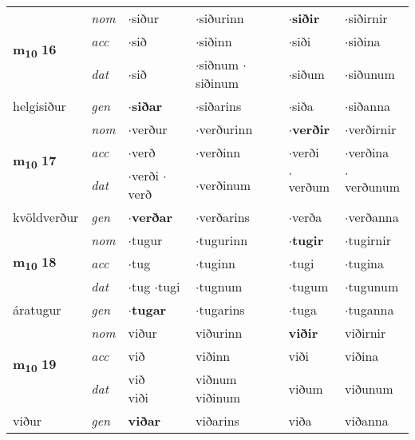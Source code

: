 \begin{longtable}[l]{llllll}
\multirow{3}{*}{{{\textbf{m{\textsubscript{10}}} \Large{\textbf{16}}}}}  & {\footnotesize{{\textit{nom}}}} & $\cdot$siður & $\cdot$siðurinn    & \textbf{$\cdot$siðir} & $\cdot$siðirnir  \\*
 &  {\footnotesize{{\textit{acc}}}} & $\cdot$sið  & $\cdot$siðinn   & $\cdot$siði  & $\cdot$siðina \\*
 &  {\footnotesize{{\textit{dat}}}} & $\cdot$sið & \specialcell{$\cdot$siðnum\\  $\cdot$siðinum}   & $\cdot$siðum & $\cdot$siðunum \\*
 {\footnotesize{helgisiður}} &   {\footnotesize{{\textit{gen}}}} & \textbf{$\cdot$siðar}  & $\cdot$siðarins  & $\cdot$siða & $\cdot$siðanna \\
\cmidrule{1-6}


\multirow{3}{*}{{{\textbf{m{\textsubscript{10}}} \Large{\textbf{17}}}}}  & {\footnotesize{{\textit{nom}}}} & $\cdot$verður & $\cdot$verðurinn    & \textbf{$\cdot$verðir} & $\cdot$verðirnir  \\*
 &  {\footnotesize{{\textit{acc}}}} & $\cdot$verð  & $\cdot$verðinn   & $\cdot$verði  & $\cdot$verðina \\*
 &  {\footnotesize{{\textit{dat}}}} & \specialcell{$\cdot$verði\\  $\cdot$verð} & $\cdot$verðinum   & $\cdot$verðum & $\cdot$verðunum \\*
 {\footnotesize{kvöldverður}} &   {\footnotesize{{\textit{gen}}}} & \textbf{$\cdot$verðar}  & $\cdot$verðarins  & $\cdot$verða & $\cdot$verðanna \\
\cmidrule{1-6}


\multirow{3}{*}{{{\textbf{m{\textsubscript{10}}} \Large{\textbf{18}}}}}  & {\footnotesize{{\textit{nom}}}} & $\cdot$tugur & $\cdot$tugurinn    & \textbf{$\cdot$tugir} & $\cdot$tugirnir  \\*
 &  {\footnotesize{{\textit{acc}}}} & $\cdot$tug  & $\cdot$tuginn   & $\cdot$tugi  & $\cdot$tugina \\*
 &  {\footnotesize{{\textit{dat}}}} & \specialcell{$\cdot$tug\\  $\cdot$tugi} & $\cdot$tugnum   & $\cdot$tugum & $\cdot$tugunum \\*
 {\footnotesize{áratugur}} &   {\footnotesize{{\textit{gen}}}} & \textbf{$\cdot$tugar}  & $\cdot$tugarins  & $\cdot$tuga & $\cdot$tuganna \\
\cmidrule{1-6}


\multirow{3}{*}{{{\textbf{m{\textsubscript{10}}} \Large{\textbf{19}}}}}  & {\footnotesize{{\textit{nom}}}} & viður & viðurinn    & \textbf{viðir} & viðirnir  \\*
 &  {\footnotesize{{\textit{acc}}}} & við  & viðinn   & viði  & viðina \\*
 &  {\footnotesize{{\textit{dat}}}} & \specialcell{við\\ viði} & \specialcell{viðnum\\ viðinum}   & viðum & viðunum \\*
 {\footnotesize{viður}} &   {\footnotesize{{\textit{gen}}}} & \textbf{viðar}  & viðarins  & viða & viðanna \\
\cmidrule{1-6}



\end{longtable}

